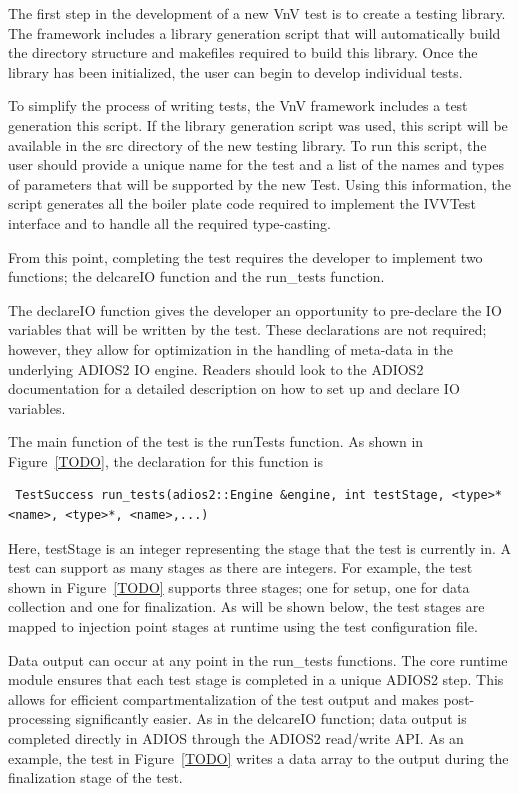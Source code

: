 The first step in the development of a new VnV test is to create a testing library. The framework includes a library generation script that will automatically build the directory structure and makefiles required to 
build this library. Once the library has been initialized, the user can begin to develop individual tests. 

To simplify the process of writing tests, the VnV framework includes a test generation this script. If the library generation script was used, this script will be available in the src directory of the new testing library. To run this script, the user should provide a unique name for the test and a list of the names and types of parameters that will be supported by the new Test. Using this information, the script generates all the boiler plate code required to implement the IVVTest interface and to handle all the required type-casting. 

From this point, completing the test requires the developer to implement two functions; the delcareIO function and the run\_tests function. 

The declareIO function gives the developer an opportunity to pre-declare the IO variables that will be written by the test. These declarations are not required; however, they allow for optimization in the handling of meta-data in the underlying ADIOS2 IO engine. Readers should look to the ADIOS2 documentation for a detailed description on how to set up and declare IO variables. 

The main function of the test is the runTests function. As shown in Figure~\ref{TODO}, the declaration for this function is

\begin{verbatim}
 TestSuccess run_tests(adios2::Engine &engine, int testStage, <type>* <name>, <type>*, <name>,...)
\end{verbatim}

Here, testStage is an integer representing the stage that the test is currently in. A test can support as many stages as there are integers. For example, 
the test shown in Figure~\ref{TODO} supports three stages; one for setup, one for data collection and one for finalization. As will be shown below, the test 
stages are mapped to injection point stages at runtime using the test configuration file. 

Data output can occur at any point in the run\_tests functions. The core runtime module ensures that each test stage is completed in a unique ADIOS2 step. This allows for efficient 
compartmentalization of the test output and makes post-processing significantly easier. As in the delcareIO function; data output is completed directly in ADIOS through the 
ADIOS2 read/write API. As an example, the test in Figure~\ref{TODO} writes a data array to the output during the finalization stage of the test. 

